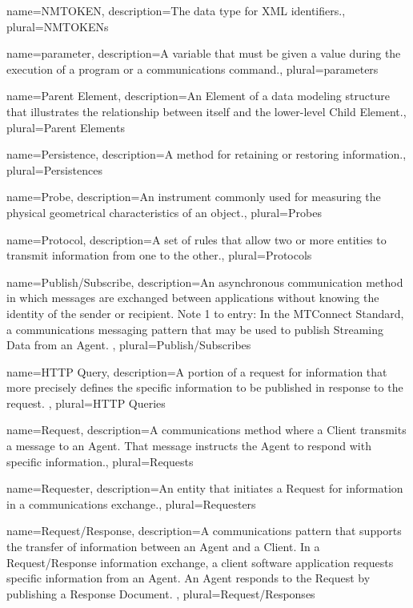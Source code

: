 {
    name={NMTOKEN},
	description={The data type for XML identifiers.},
	plural={NMTOKENs}
}

{
    name={parameter},
	description={A variable that must be given a value during the execution of a program or a communications command.},
	plural={parameters}
}

{
    name={Parent Element},
	description={An \gls{Element} of a data modeling structure that illustrates the relationship between itself and the lower-level \gls{Child Element}.},
	plural={Parent Elements}
}

{
    name={Persistence},
	description={A method for retaining or restoring information.},
	plural={Persistences}
}

{
    name={Probe},
	description={An instrument commonly used for measuring the physical geometrical characteristics of an object.},
	plural={Probes}
}

{
    name={Protocol},
	description={A set of rules that allow two or more entities to transmit information from one to the other.},
	plural={Protocols}
}

{
    name={Publish/Subscribe},
	description={An asynchronous communication method in which messages are exchanged between applications without knowing the identity of the sender or recipient.
Note 1 to entry: In the MTConnect Standard, a communications messaging pattern that may be used to publish \gls{Streaming Data} from an \gls{Agent}. },
	plural={Publish/Subscribes}
}

{
    name={HTTP Query},
	description={A portion of a request for information that more precisely defines the specific information to be published in response to the request. },
	plural={HTTP Queries}
}

{
    name={Request},
	description={A communications method where a \gls{Client} transmits a message to an \gls{Agent}.  That message instructs the \gls{Agent} to respond with specific information.},
	plural={Requests}
}

{
    name={Requester},
	description={An entity that initiates a \gls{Request} for information in a communications exchange.},
	plural={Requesters}
}

{
    name={Request/Response},
	description={A communications pattern that supports the transfer of information between an \gls{Agent} and a \gls{Client}. 
In a \gls{Request/Response} information exchange, a client software application requests specific information from an \gls{Agent}. An \gls{Agent} responds to the \gls{Request} by publishing a \gls{Response Document}. },
	plural={Request/Responses}
}

